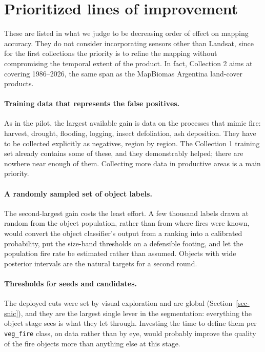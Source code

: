 \documentclass[11pt,a4paper]{article}
\begin{document}
\section{Prioritized lines of improvement}

These are listed in what we judge to be decreasing order of effect on mapping accuracy. They do not
consider incorporating sensors other than Landsat, since for the first collections the priority is
to refine the mapping without compromising the temporal extent of the product. In fact, Collection 2
aims at covering 1986--2026, the same span as the MapBiomas Argentina land-cover products.

\paragraph{Training data that represents the false positives.} As in the pilot, the largest
available gain is data on the processes that mimic fire: harvest, drought, flooding, logging,
insect defoliation, ash deposition. They have to be collected explicitly as negatives, region by
region. The Collection 1 training set already contains some of these, and they demonstrably helped;
there are nowhere near enough of them. Collecting more data in productive areas is a main priority.

\paragraph{A randomly sampled set of object labels.} The second-largest gain costs the least effort.
A few thousand labels drawn at random from the object population, rather than from where fires were
known, would convert the object classifier's output from a ranking into a calibrated probability,
put the size-band thresholds on a defensible footing, and let the population fire rate be estimated
rather than assumed. Objects with wide posterior intervals are the natural targets for a second
round.

\paragraph{Thresholds for seeds and candidates.} The deployed cuts were set by visual exploration
and are global (Section~\ref{sec-snic}), and they are the largest single lever in the segmentation:
everything the object stage sees is what they let through. Investing the time to define them per
\texttt{veg\_fire} class, on data rather than by eye, would probably improve the quality of the
fire objects more than anything else at this stage.
\end{document}
